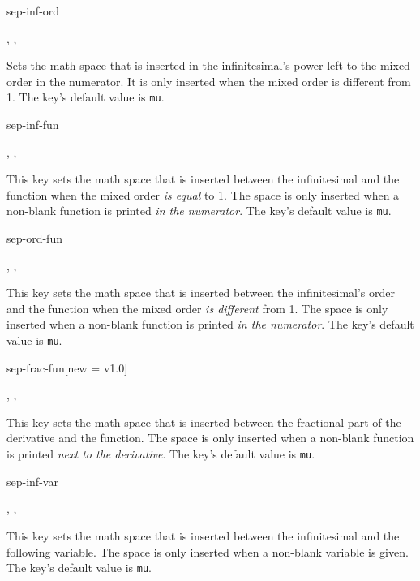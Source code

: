 	\clearpage
	
	\begin{option}{sep-inf-ord}
		\begin{values}[default = 0]
			, , 
		\end{values}
		Sets the math space that is inserted in the infinitesimal's power left to the mixed order in the numerator. It is only inserted when the mixed order is different from \num{1}. The key's default value is  \texttt{mu}.
	\end{option}
	
	\begin{option}{sep-inf-fun}
		\begin{values}[default = 0]
			, , 
		\end{values}
		This key sets the math space that is inserted between the infinitesimal and the function when the mixed order \emph{is equal} to \num{1}. The space is only inserted when a non-blank function is printed \emph{in the numerator}. The key's default value is  \texttt{mu}.
	\end{option}
	
	\begin{option}{sep-ord-fun}
		\begin{values}[default = 0]
			, , 
		\end{values}
		This key sets the math space that is inserted between the infinitesimal's order and the function when the mixed order \emph{is different} from \num{1}. The space is only inserted when a non-blank function is printed \emph{in the numerator}. The key's default value is  \texttt{mu}.
	\end{option}
	
	\begin{option}{sep-frac-fun}[new = v1.0]
		\begin{values}[default = 0]
			, , 
		\end{values}
		This key sets the math space that is inserted between the fractional part of the derivative and the function. The space is only inserted when a non-blank function is printed \emph{next to the derivative}. The key's default value is  \texttt{mu}.
	\end{option}
	
	\begin{option}{sep-inf-var}
		\begin{values}[default = 0]
			, , 
		\end{values}
		This key sets the math space that is inserted between the infinitesimal and the following variable. The space is only inserted when a non-blank variable is given. The key's default value is  \texttt{mu}.
	\end{option}
	
